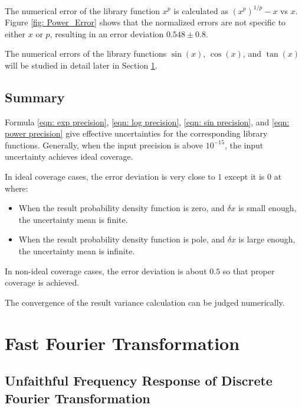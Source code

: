 \documentclass[twoside]{article}
\numberwithin{equation}{section}
\begin{document}
The numerical error of the library function $x^p$ is calculated as $(x^p)^{1/p} - x$ vs $x$.
Figure \ref{fig: Power_Error} shows that the normalized errors are not specific to either $x$ or $p$, resulting in an error deviation $0.548 \pm 0.8$.

The numerical errors of the library functions $\sin(x)$, $\cos(x)$, and $\tan(x)$ will be studied in detail later in Section \ref{sec: FFT}.


\subsection{Summary}

Formula \eqref{eqn: exp precision}, \eqref{eqn: log precision}, \eqref{eqn: sin precision}, and \eqref{eqn: power precision} give effective uncertainties for the corresponding library functions.
Generally, when the input precision is above $10^{-15}$, the input uncertainty achieves ideal coverage.

In ideal coverage cases, the error deviation is very close to $1$ except it is $0$ at where:
\begin{itemize}
\item When the result probability density function is zero, and $\delta x$ is small enough, the uncertainty mean is finite.

\item When the result probability density function is pole, and $\delta x$ is large enough, the uncertainty mean is infinite.

\end{itemize}
In non-ideal coverage cases, the error deviation is about $0.5$ so that proper coverage is achieved.

The convergence of the result variance calculation can be judged numerically.



\clearpage
\section{Fast Fourier Transformation}
\label{sec: FFT}


\subsection{Unfaithful Frequency Response of Discrete Fourier Transformation \cite{Prev_Precision_Arithmetic}}

\iffalse
\end{document}
